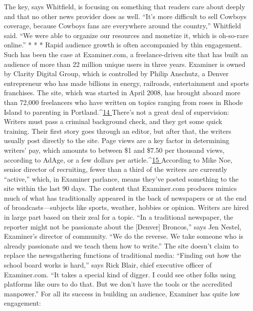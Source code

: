 The key, says Whitfield, is focusing on something that readers care about
deeply and that no other news provider does as well. ``It’s more difficult to sell
Cowboys coverage, because Cowboys fans are everywhere around the country,''
Whitfield said. ``We were able to organize our resources and monetize it, which
is oh-so-rare online.''
* * *
Rapid audience growth is often accompanied by thin engagement. Such has
been the case at Examiner.com, a freelance-driven site that has built an audience
of more than 22 million unique users in three years.
Examiner is owned by Clarity Digital Group, which is controlled by Philip
Anschutz, a Denver entrepreneur who has made billions in energy, railroads,
entertainment and sports franchises. The site, which was started in April 2008,
has brought aboard more than 72,000 freelancers who have written on topics
ranging from roses in Rhode Island to parenting in Portland.^{\href{#endnotes-ch2}{14 }}There’s not a
great deal of supervision: Writers must pass a criminal background check, and
they get some quick training. Their first story goes through an editor, but after
that, the writers usually post directly to the site.
Page views are a key factor in determining writers’ pay, which amounts to
between \$1 and \$7.50 per thousand views, according to AdAge, or a few dollars
per article.^{\href{#endnotes-ch2}{15 }}According to Mike Noe, senior director of recruiting, fewer than a
third of the writers are currently ``active,'' which, in Examiner parlance, means
they’ve posted something to the site within the last 90 days.
The content that Examiner.com produces mimics much of what has traditionally
appeared in the back of newspapers or at the end of broadcasts—subjects
like sports, weather, hobbies or opinion. Writers are hired in large part
based on their zeal for a topic. ``In a traditional newspaper, the reporter might
not be passionate about the [Denver] Broncos,'' says Jen Nestel, Examiner’s director
of community. ``We do the reverse. We take someone who is already
passionate and we teach them how to write.'' The site doesn’t claim to replace
the newsgathering functions of traditional media: ``Finding out how the school
board works is hard,'' says Rick Blair, chief executive officer of Examiner.com.
``It takes a special kind of digger. I could see other folks using platforms like ours
to do that. But we don’t have the tools or the accredited manpower.''
For all its success in building an audience, Examiner has quite low engagement:
